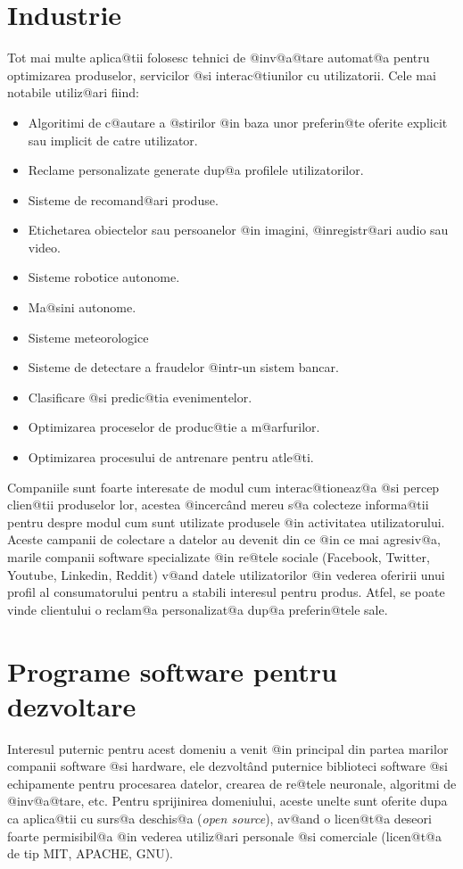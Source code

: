 \section{Industrie}

	Tot mai multe aplica@tii folosesc tehnici de @inv@a@tare automat@a pentru optimizarea produselor, servicilor @si interac@tiunilor cu utilizatorii. Cele mai notabile utiliz@ari fiind:
\begin{itemize}
	\item Algoritimi de c@autare a @stirilor @in baza unor preferin@te oferite explicit sau implicit de catre utilizator.
	\item Reclame personalizate generate dup@a profilele utilizatorilor.
	\item Sisteme de recomand@ari produse.
	\item Etichetarea obiectelor sau persoanelor @in imagini, @inregistr@ari audio sau video.
	\item Sisteme robotice autonome.
	\item Ma@sini autonome.
	\item Sisteme meteorologice
	\item Sisteme de detectare a fraudelor @intr-un sistem bancar.
	\item Clasificare @si predic@tia evenimentelor. 
	\item Optimizarea proceselor de produc@tie a m@arfurilor.
	\item Optimizarea procesului de antrenare pentru atle@ti.
\end{itemize}

	Companiile sunt foarte interesate de modul cum interac@tioneaz@a @si percep clien@tii produselor lor, acestea @incerc\^ and mereu s@a colecteze informa@tii pentru despre modul cum sunt utilizate produsele @in activitatea utilizatorului. Aceste campanii de colectare a datelor au devenit din ce @in ce mai agresiv@a, marile companii software specializate @in re@tele sociale (Facebook, Twitter, Youtube, Linkedin, Reddit) v@and datele utilizatorilor @in vederea oferirii unui profil al consumatorului pentru a stabili interesul pentru produs. Atfel, se poate vinde clientului o reclam@a personalizat@a dup@a preferin@tele sale. 
	 
\section{Programe software pentru dezvoltare}

Interesul puternic pentru acest domeniu a venit @in principal din partea marilor companii software @si hardware, ele dezvolt\^ and puternice biblioteci software @si echipamente pentru procesarea datelor, crearea de re@tele neuronale, algoritmi de @inv@a@tare, etc. Pentru sprijinirea domeniului, aceste unelte sunt oferite dupa ca aplica@tii cu surs@a deschis@a ({\sl open source}), av@and o licen@t@a deseori foarte permisibil@a @in vederea utiliz@ari personale @si comerciale (licen@t@a de tip MIT, APACHE, GNU).

